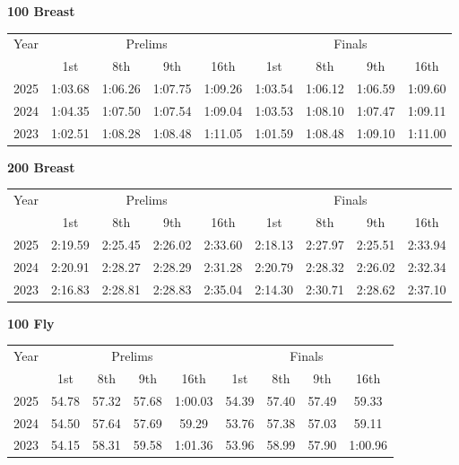 \textbf{100 Breast}

\begin{flushleft}
\begin{tabular}{|c|c|c|c|c|c|c|c|c|}
\hline
Year & \multicolumn{4}{c|}{Prelims} & \multicolumn{4}{c|}{Finals} \\
\cline{2-9}
& 1st & 8th & 9th & 16th & 1st & 8th & 9th & 16th \\
\hline
2025 & 1:03.68 & 1:06.26 & 1:07.75 & 1:09.26 & 1:03.54 & 1:06.12 & 1:06.59 & 1:09.60 \\
2024 & 1:04.35 & 1:07.50 & 1:07.54 & 1:09.04 & 1:03.53 & 1:08.10 & 1:07.47 & 1:09.11 \\
2023 & 1:02.51 & 1:08.28 & 1:08.48 & 1:11.05 & 1:01.59 & 1:08.48 & 1:09.10 & 1:11.00 \\
\hline
\end{tabular}
\end{flushleft}

\textbf{200 Breast}

\begin{flushleft}
\begin{tabular}{|c|c|c|c|c|c|c|c|c|}
\hline
Year & \multicolumn{4}{c|}{Prelims} & \multicolumn{4}{c|}{Finals} \\
\cline{2-9}
& 1st & 8th & 9th & 16th & 1st & 8th & 9th & 16th \\
\hline
2025 & 2:19.59 & 2:25.45 & 2:26.02 & 2:33.60 & 2:18.13 & 2:27.97 & 2:25.51 & 2:33.94 \\
2024 & 2:20.91 & 2:28.27 & 2:28.29 & 2:31.28 & 2:20.79  & 2:28.32 & 2:26.02 & 2:32.34  \\
2023 & 2:16.83 & 2:28.81 & 2:28.83 & 2:35.04 & 2:14.30 & 2:30.71 & 2:28.62 & 2:37.10 \\
\hline
\end{tabular}
\end{flushleft}

\textbf{100 Fly}

\begin{flushleft}
\begin{tabular}{|c|c|c|c|c|c|c|c|c|}
\hline
Year & \multicolumn{4}{c|}{Prelims} & \multicolumn{4}{c|}{Finals} \\
\cline{2-9}
& 1st & 8th & 9th & 16th & 1st & 8th & 9th & 16th \\
\hline
2025 & 54.78 & 57.32 & 57.68 & 1:00.03 & 54.39 & 57.40 & 57.49 & 59.33 \\
2024 & 54.50 & 57.64 & 57.69 & 59.29 & 53.76 & 57.38 & 57.03 & 59.11 \\
2023 & 54.15 & 58.31 & 59.58 & 1:01.36 & 53.96 & 58.99 & 57.90 & 1:00.96 \\
\hline
\end{tabular}
\end{flushleft}

